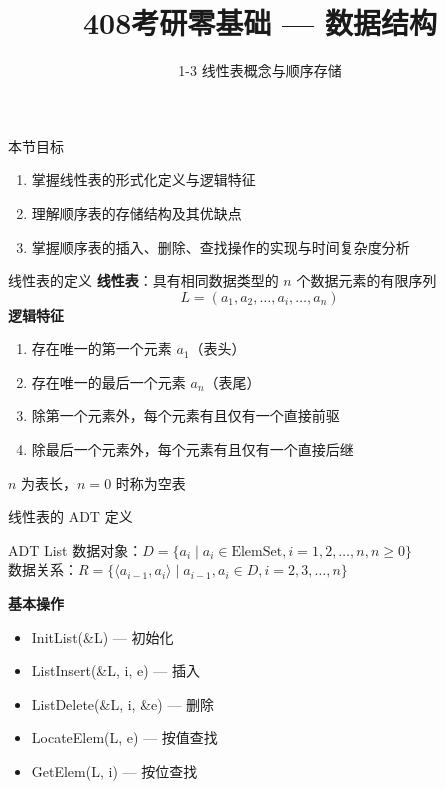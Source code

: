 \documentclass[10pt, aspectratio=169]{beamer}
\title{408考研零基础 --- 数据结构}
\subtitle{1-3 线性表概念与顺序存储}
\author{}
\date{}
\begin{document}
\begin{frame}{本节目标}
    \begin{enumerate}
        \item 掌握线性表的形式化定义与逻辑特征
        \item 理解顺序表的存储结构及其优缺点
        \item 掌握顺序表的插入、删除、查找操作的实现与时间复杂度分析
    \end{enumerate}
\end{frame}

\begin{frame}{线性表的定义}
    \textbf{线性表}：具有相同数据类型的 $n$ 个数据元素的有限序列
    \[
    L = (a_1, a_2, \ldots, a_i, \ldots, a_n)
    \]
    \vspace{0.5em}
    \textbf{逻辑特征}
    \begin{enumerate}
        \item 存在唯一的第一个元素 $a_1$（表头）
        \item 存在唯一的最后一个元素 $a_n$（表尾）
        \item 除第一个元素外，每个元素有且仅有一个直接前驱
        \item 除最后一个元素外，每个元素有且仅有一个直接后继
    \end{enumerate}
    \vspace{0.5em}
    $n$ 为表长，$n = 0$ 时称为空表
\end{frame}

\begin{frame}{线性表的 ADT 定义}
    \begin{block}{ADT List}
        数据对象：$D = \{a_i \mid a_i \in \text{ElemSet}, i = 1,2,\ldots,n, n \ge 0\}$ \\
        数据关系：$R = \{\langle a_{i-1}, a_i \rangle \mid a_{i-1}, a_i \in D, i = 2,3,\ldots,n\}$
    \end{block}
    \vspace{0.5em}
    \textbf{基本操作}
    \begin{itemize}
        \item InitList(\&L) --- 初始化
        \item ListInsert(\&L, i, e) --- 插入
        \item ListDelete(\&L, i, \&e) --- 删除
        \item LocateElem(L, e) --- 按值查找
        \item GetElem(L, i) --- 按位查找
    \end{itemize}
\end{frame}
\end{document}
